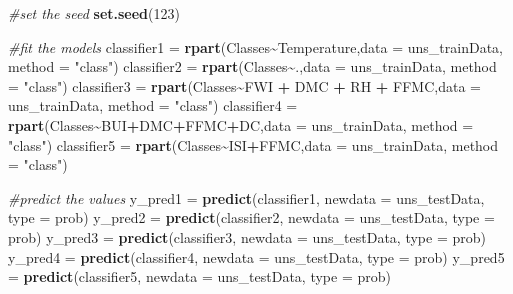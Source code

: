 \documentclass[
]{article}
\newenvironment{Shaded}{\begin{snugshade}}{\end{snugshade}}
\newcommand{\AttributeTok}[1]{\textcolor[rgb]{0.13,0.29,0.53}{#1}}
\newcommand{\CommentTok}[1]{\textcolor[rgb]{0.56,0.35,0.01}{\textit{#1}}}
\newcommand{\DecValTok}[1]{\textcolor[rgb]{0.00,0.00,0.81}{#1}}
\newcommand{\FunctionTok}[1]{\textcolor[rgb]{0.13,0.29,0.53}{\textbf{#1}}}
\newcommand{\NormalTok}[1]{#1}
\newcommand{\OtherTok}[1]{\textcolor[rgb]{0.56,0.35,0.01}{#1}}
\newcommand{\SpecialCharTok}[1]{\textcolor[rgb]{0.81,0.36,0.00}{\textbf{#1}}}
\newcommand{\StringTok}[1]{\textcolor[rgb]{0.31,0.60,0.02}{#1}}
\begin{document}
\begin{Shaded}
\begin{Highlighting}[]
\CommentTok{\#set the seed}
\FunctionTok{set.seed}\NormalTok{(}\DecValTok{123}\NormalTok{)}

\CommentTok{\#fit the models}
\NormalTok{classifier1 }\OtherTok{=} \FunctionTok{rpart}\NormalTok{(Classes}\SpecialCharTok{\textasciitilde{}}\NormalTok{Temperature,}\AttributeTok{data =}\NormalTok{ uns\_trainData, }\AttributeTok{method =} \StringTok{"class"}\NormalTok{)}
\NormalTok{classifier2 }\OtherTok{=} \FunctionTok{rpart}\NormalTok{(Classes}\SpecialCharTok{\textasciitilde{}}\NormalTok{.,}\AttributeTok{data =}\NormalTok{ uns\_trainData, }\AttributeTok{method =} \StringTok{"class"}\NormalTok{)}
\NormalTok{classifier3 }\OtherTok{=} \FunctionTok{rpart}\NormalTok{(Classes}\SpecialCharTok{\textasciitilde{}}\NormalTok{FWI }\SpecialCharTok{+}\NormalTok{ DMC }\SpecialCharTok{+}\NormalTok{ RH }\SpecialCharTok{+}\NormalTok{ FFMC,}\AttributeTok{data =}\NormalTok{ uns\_trainData, }\AttributeTok{method =} \StringTok{"class"}\NormalTok{)}
\NormalTok{classifier4 }\OtherTok{=} \FunctionTok{rpart}\NormalTok{(Classes}\SpecialCharTok{\textasciitilde{}}\NormalTok{BUI}\SpecialCharTok{+}\NormalTok{DMC}\SpecialCharTok{+}\NormalTok{FFMC}\SpecialCharTok{+}\NormalTok{DC,}\AttributeTok{data =}\NormalTok{ uns\_trainData, }\AttributeTok{method =} \StringTok{"class"}\NormalTok{)}
\NormalTok{classifier5 }\OtherTok{=} \FunctionTok{rpart}\NormalTok{(Classes}\SpecialCharTok{\textasciitilde{}}\NormalTok{ISI}\SpecialCharTok{+}\NormalTok{FFMC,}\AttributeTok{data =}\NormalTok{ uns\_trainData, }\AttributeTok{method =} \StringTok{"class"}\NormalTok{)}

\CommentTok{\#predict the values}
\NormalTok{y\_pred1 }\OtherTok{=} \FunctionTok{predict}\NormalTok{(classifier1, }\AttributeTok{newdata =}\NormalTok{ uns\_testData, }\AttributeTok{type =} \StringTok{\textquotesingle{}prob\textquotesingle{}}\NormalTok{)}
\NormalTok{y\_pred2 }\OtherTok{=} \FunctionTok{predict}\NormalTok{(classifier2, }\AttributeTok{newdata =}\NormalTok{ uns\_testData, }\AttributeTok{type =} \StringTok{\textquotesingle{}prob\textquotesingle{}}\NormalTok{)}
\NormalTok{y\_pred3 }\OtherTok{=} \FunctionTok{predict}\NormalTok{(classifier3, }\AttributeTok{newdata =}\NormalTok{ uns\_testData, }\AttributeTok{type =} \StringTok{\textquotesingle{}prob\textquotesingle{}}\NormalTok{)}
\NormalTok{y\_pred4 }\OtherTok{=} \FunctionTok{predict}\NormalTok{(classifier4, }\AttributeTok{newdata =}\NormalTok{ uns\_testData, }\AttributeTok{type =} \StringTok{\textquotesingle{}prob\textquotesingle{}}\NormalTok{)}
\NormalTok{y\_pred5 }\OtherTok{=} \FunctionTok{predict}\NormalTok{(classifier5, }\AttributeTok{newdata =}\NormalTok{ uns\_testData, }\AttributeTok{type =} \StringTok{\textquotesingle{}prob\textquotesingle{}}\NormalTok{)}


\end{Highlighting}
\end{Shaded}
\end{document}
